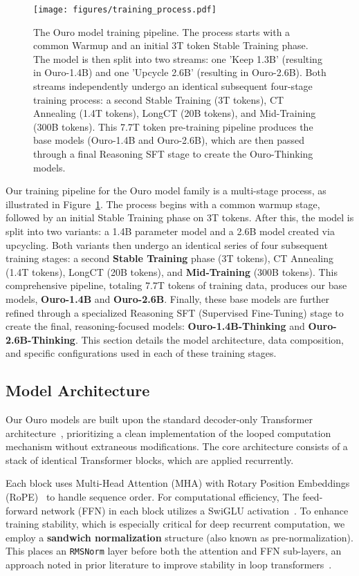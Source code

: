\documentclass[]{bytedance_seed}
\newcommand{\1}{\mathbf{1}}
\begin{document}
\begin{figure}[htbp]
    \centering
    \texttt{[image: figures/training\_process.pdf]}
    \caption{The Ouro model training pipeline. The process starts with a common Warmup and an initial 3T token Stable Training phase. The model is then split into two streams: one 'Keep 1.3B' (resulting in Ouro-1.4B) and one 'Upcycle 2.6B' (resulting in Ouro-2.6B). Both streams independently undergo an identical subsequent four-stage training process: a second Stable Training (3T tokens), CT Annealing (1.4T tokens), LongCT (20B tokens), and Mid-Training (300B tokens). This 7.7T token pre-training pipeline produces the base models (Ouro-1.4B and Ouro-2.6B), which are then passed through a final Reasoning SFT stage to create the Ouro-Thinking models.}
    \label{fig:training_process}
\end{figure}
Our training pipeline for the Ouro model family is a multi-stage process, as illustrated in Figure~\ref{fig:training_process}. The process begins with a common warmup stage, followed by an initial Stable Training phase on 3T tokens. After this, the model is split into two variants: a 1.4B parameter model and a 2.6B model created via upcycling. Both variants then undergo an identical series of four subsequent training stages: a second \textbf{Stable Training} phase (3T tokens), CT Annealing (1.4T tokens), LongCT (20B tokens), and \textbf{Mid-Training} (300B tokens). This comprehensive pipeline, totaling 7.7T tokens of training data, produces our base models, \textbf{Ouro-1.4B} and \textbf{Ouro-2.6B}. Finally, these base models are further refined through a specialized Reasoning SFT (Supervised Fine-Tuning) stage to create the final, reasoning-focused models: \textbf{Ouro-1.4B-Thinking} and \textbf{Ouro-2.6B-Thinking}. This section details the model architecture, data composition, and specific configurations used in each of these training stages.

\subsection{Model Architecture} 

Our Ouro models are built upon the standard decoder-only Transformer architecture~\cite{vaswani2017attention}, prioritizing a clean implementation of the looped computation mechanism without extraneous modifications. The core architecture consists of a stack of identical Transformer blocks, which are applied recurrently.

Each block uses Multi-Head Attention (MHA) with Rotary Position Embeddings (RoPE)~\cite{su2023roformerenhancedtransformerrotary} to handle sequence order. For computational efficiency, The feed-forward network (FFN) in each block utilizes a SwiGLU activation~\cite{shazeer2020glu}. To enhance training stability, which is especially critical for deep recurrent computation, we employ a \textbf{sandwich normalization} structure (also known as pre-normalization). This places an \texttt{RMSNorm} layer before both the attention and FFN sub-layers, an approach noted in prior literature to improve stability in loop transformers~\cite{geiping2025scaling}.
\end{document}
